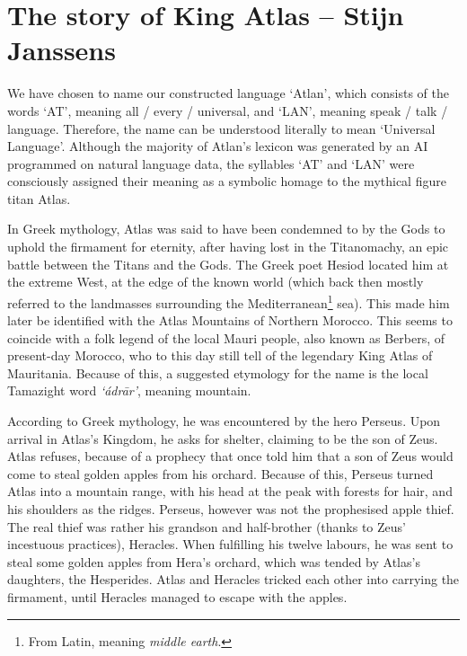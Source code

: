 \section{The story of King Atlas -- {\small Stijn Janssens}}

We have chosen to name our constructed language ‘Atlan’, which consists of the words ‘AT’, meaning all / every / universal, and ‘LAN’, meaning speak / talk / language. Therefore, the name can be understood literally to mean ‘Universal Language’. Although the majority of Atlan’s lexicon was generated by an AI programmed on natural language data, the syllables ‘AT’ and ‘LAN’ were consciously assigned their meaning as a symbolic homage to the mythical figure titan Atlas.  

In Greek mythology, Atlas was said to have been condemned to by the Gods to uphold the firmament for eternity, after having lost in the Titanomachy, an epic battle between the Titans and the Gods. The Greek poet Hesiod located him at the extreme West, at the edge of the known world (which back then mostly referred to the landmasses surrounding the Mediterranean\footnote{From Latin, meaning \textit{middle earth}.} sea). This made him later be identified with the Atlas Mountains of Northern Morocco. This seems to coincide with a folk legend of the local Mauri people, also known as Berbers, of present-day Morocco, who to this day still tell of the legendary King Atlas of Mauritania.  Because of this, a suggested etymology for the name is the local Tamazight word \textit{‘ádrār’}, meaning mountain.  

According to Greek mythology, he was encountered by the hero Perseus. Upon arrival in Atlas’s Kingdom, he asks for shelter, claiming to be the son of Zeus. Atlas refuses, because of a prophecy that once told him that a son of Zeus would come to steal golden apples from his orchard. Because of this, Perseus turned Atlas into a mountain range, with his head at the peak with forests for hair, and his shoulders as the ridges. Perseus, however was not the prophesised apple thief. The real thief was rather his grandson and half-brother (thanks to Zeus’ incestuous practices), Heracles. When fulfilling his twelve labours, he was sent to steal some golden apples from Hera’s orchard, which was tended by Atlas’s daughters, the Hesperides. Atlas and Heracles tricked each other into carrying the firmament, until Heracles managed to escape with the apples.

